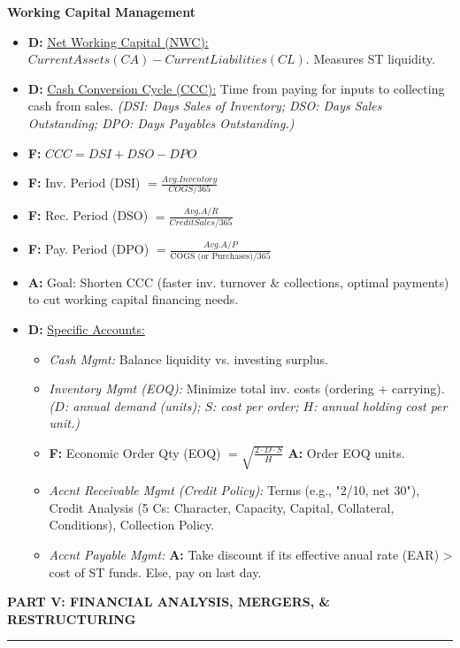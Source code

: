 \documentclass[7pt,landscape]{extarticle} %
\newcommand{\cheatsheetsection}[1]{%
  \vspace{0.25ex plus 0.1ex minus 0.05ex}%
  \noindent\color{SecTitleColor}\textbf{\sffamily\small\MakeUppercase{#1}}%
  \par\vspace{0.02ex}%
  {\color{RuleColor}\hrule height 0.3pt}\par\vspace{0.15ex}%
}
\newcommand{\cheatsheetsubsubsection}[1]{%
  \vspace{0.15ex plus 0.05ex minus 0.05ex}%
  \noindent\textbf{\sffamily\scriptsize #1}%
  \par\vspace{0.05ex}%
}
\newcommand{\D}[1]{\textbf{\textcolor{DefColor}{D:}} \uline{#1}}
\newcommand{\F}[1]{\textbf{\textcolor{FormColor}{F:}} #1}
\newcommand{\A}[1]{\textbf{\textcolor{AppColor}{A:}} #1}
\newcommand{\SF}[1]{\textit{\small (#1)}} %
\begin{document}
\begin{multicols*}{4}
  \cheatsheetsubsubsection{Working Capital Management}
  \begin{itemize}
    \item \D{Net Working Capital (NWC):} $Current Assets (CA) - Current Liabilities (CL)$. Measures ST liquidity.
    \item \D{Cash Conversion Cycle (CCC):} Time from paying for inputs to collecting cash from sales.
          \SF{DSI: Days Sales of Inventory; DSO: Days Sales Outstanding; DPO: Days Payables Outstanding.}
    \item \F{$CCC = DSI + DSO - DPO$}
    \item \F{Inv. Period (DSI) $= \frac{Avg.Inventory}{COGS/365}$}
    \item \F{Rec. Period (DSO) $= \frac{Avg.A/R}{Credit Sales/365}$}
    \item \F{Pay. Period (DPO) $= \frac{Avg.A/P}{\text{COGS (or Purchases)}/365}$}
    \item \A{Goal: Shorten CCC (faster inv. turnover \& collections, optimal payments) to cut working capital financing needs.}
    \item \D{Specific Accounts:}
          \begin{itemize}
            \item \emph{Cash Mgmt:} Balance liquidity vs. investing surplus.
            \item \emph{Inventory Mgmt (EOQ):} Minimize total inv. costs (ordering + carrying).
                  \SF{$D$: annual demand (units); $S$: cost per order; $H$: annual holding cost per unit.}
            \item \F{Economic Order Qty (EOQ) $= \sqrt{\frac{2 \cdot D \cdot S}{H}}$} \A{Order EOQ units.}
            \item \emph{Accnt Receivable Mgmt (Credit Policy):} Terms (e.g., "2/10, net 30"), Credit Analysis (5 Cs: Character, Capacity, Capital, Collateral, Conditions), Collection Policy.
            \item \emph{Accnt Payable Mgmt:} \A{Take discount if its effective anual rate (EAR) > cost of ST funds. Else, pay on last day.}
          \end{itemize}
  \end{itemize}

  \cheatsheetsection{Part V: Financial Analysis, Mergers, \& Restructuring}
  

\end{multicols*}
\end{document}
